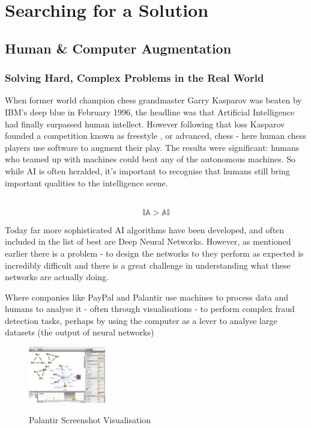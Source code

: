 \documentclass[a4paper,11pt,titlepage]{article}
\begin{document}
\section{Searching for a Solution}
	\subsection{Human \& Computer Augmentation}

\subsubsection{Solving Hard, Complex Problems in the Real World}

When former world champion chess grandmaster Garry Kasparov was beaten by IBM’s deep blue in February 1996, the headline was that Artificial Intelligence had finally surpassed human intellect. However following that loss Kasparov founded a competition known as freestyle , or advanced, chess - here human chess players use software to augment their play. The results were significant: humans who teamed up with machines could beat any of the autonomous machines. So while AI is often heralded, it's important to recognise that humans still bring important qualities to the intelligence scene. 
\\\

		$$
			\mathbb{IA} > \mathbb{AI}
		$$
	
Today far more sophisticated AI algorithms have been developed, and often included in the list of best are Deep Neural Networks. However, as mentioned earlier there is a problem - to design the networks to they perform as expected is incredibly difficult and there is a great challenge in understanding what these networks are actually doing. 

Where companies like PayPal and Palantir use machines to process data and humans to analyse it - often through visualisations - to perform complex fraud detection tasks, perhaps by using the computer as a lever to analyse large datasets (the output of neural networks) 


		\begin{figure}[H]
    			\centering	
			{{\includegraphics[width=0.3\textwidth]
    				{img/palantir_01.png} 
    			}}%
    			\caption{Palantir Screenshot Visualisation}%
    		\label{fig:Palantir}
		\end{figure}
\end{document}
